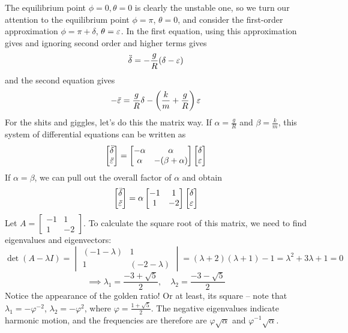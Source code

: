 \documentclass[12pt]{scrartcl}
\begin{document}
The equilibrium point $\phi = 0, \theta = 0$ is clearly the unstable one, so we turn our attention to the equilibrium point $\phi = \pi$, $\theta = 0$, and consider the first-order approximation $\phi = \pi + \delta$, $\theta = \varepsilon$. In the first equation, using this approximation gives and ignoring second order and higher terms gives
\[
   \ddot \delta = -\frac g R (\delta - \varepsilon)
\]
and the second equation gives
\[
   - \ddot {\varepsilon} = \frac g R \delta - \left(\frac k m + \frac g R\right) \varepsilon
\]
For the shits and giggles, let's do this the matrix way. If $\alpha = \frac g R$ and $\beta = \frac k m$, this system of differential equations can be written as
\[
    \begin{bmatrix}
    \ddot{\delta} \\ \ddot{\varepsilon}  
    \end{bmatrix} = \begin{bmatrix}
    - \alpha & \alpha \\ \alpha & -(\beta + \alpha)
    \end{bmatrix} \begin{bmatrix}
    \delta \\ \varepsilon  
    \end{bmatrix}
\]
If $\alpha = \beta$, we can pull out the overall factor of $\alpha$ and obtain
\[
    \begin{bmatrix}
    \ddot{\delta} \\ \ddot{\varepsilon}  
    \end{bmatrix} = \alpha \begin{bmatrix}
    - 1 & 1 \\ 1 & -2
    \end{bmatrix} \begin{bmatrix}
    \delta \\ \varepsilon  
    \end{bmatrix}
\]
Let $A =  \begin{bmatrix}
    - 1 & 1 \\ 1 & -2
    \end{bmatrix}$. To calculate the square root of this matrix, we need to find eigenvalues and eigenvectors: 
\[
 \det(A - \lambda I) = \begin{vmatrix} (-1 - \lambda) & 1 \\ 1 & (-2-\lambda) \end{vmatrix} = (\lambda + 2)(\lambda + 1) - 1 = \lambda^2 + 3\lambda + 1 = 0
\]
\[
    \implies \lambda_1 = \frac{-3 + \sqrt{5}}{2}, \quad \lambda_2 = \frac{-3 - \sqrt{5}}{2}
\]
Notice the appearance of the golden ratio! Or at least, its square -- note that $\lambda_1 = - \varphi^{-2}$, $\lambda_2 = - \varphi^2$, where $\varphi = \frac{1 + \sqrt 5}{2}$. The negative eigenvalues indicate harmonic motion, and the frequencies are therefore are $\varphi\sqrt \alpha$ and $\varphi^{-1} \sqrt \alpha$. 
\end{document}
